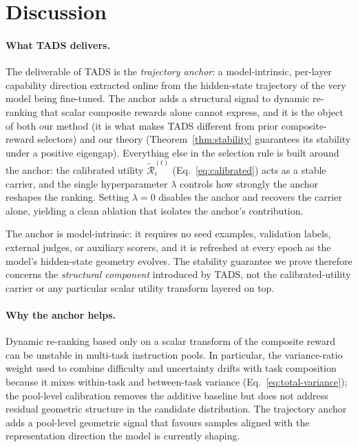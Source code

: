\section{Discussion}
\label{sec:discussion}

\paragraph{What TADS delivers.}
The deliverable of \textsc{TADS} is the \emph{trajectory anchor}:
a model-intrinsic, per-layer capability direction extracted online
from the hidden-state trajectory of the very model being
fine-tuned. The anchor adds a structural signal to dynamic
re-ranking that scalar composite rewards alone cannot express, and
it is the object of both our method (it is what makes
\textsc{TADS} different from prior composite-reward selectors) and
our theory (Theorem~\ref{thm:stability} guarantees its stability
under a positive eigengap). Everything else in the selection rule
is built around the anchor: the calibrated utility
$\tilde{\mathcal{R}}_i^{(t)}$ (Eq.~\ref{eq:calibrated}) acts as a
stable carrier, and the single hyperparameter $\lambda$ controls
how strongly the anchor reshapes the ranking. Setting $\lambda=0$
disables the anchor and recovers the carrier alone, yielding a
clean ablation that isolates the anchor's contribution.

The anchor is model-intrinsic: it requires no seed examples,
validation labels, external judges, or auxiliary scorers, and it
is refreshed at every epoch as the model's hidden-state geometry
evolves. The stability guarantee we prove therefore concerns the
\emph{structural component} introduced by \textsc{TADS}, not the
calibrated-utility carrier or any particular scalar utility
transform layered on top.

\paragraph{Why the anchor helps.}
Dynamic re-ranking based only on a scalar transform of the
composite reward can be unstable in multi-task instruction pools.
In particular, the variance-ratio weight used to combine difficulty
and uncertainty drifts with task composition because it mixes
within-task and between-task variance
(Eq.~\ref{eq:total-variance}); the pool-level calibration removes
the additive baseline but does not address residual geometric
structure in the candidate distribution. The trajectory anchor adds
a pool-level geometric signal that favours samples aligned with the
representation direction the model is currently shaping.

